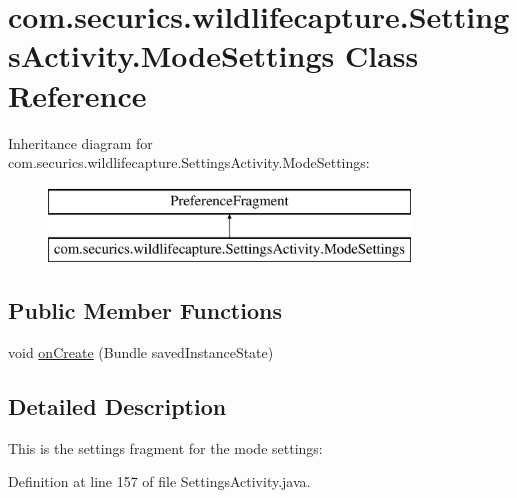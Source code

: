 \hypertarget{classcom_1_1securics_1_1wildlifecapture_1_1_settings_activity_1_1_mode_settings}{\section{com.\+securics.\+wildlifecapture.\+Settings\+Activity.\+Mode\+Settings Class Reference}
\label{classcom_1_1securics_1_1wildlifecapture_1_1_settings_activity_1_1_mode_settings}
}
Inheritance diagram for com.\+securics.\+wildlifecapture.\+Settings\+Activity.\+Mode\+Settings\+:\begin{figure}[H]
\begin{center}
\leavevmode
\includegraphics[height=2.000000cm]{classcom_1_1securics_1_1wildlifecapture_1_1_settings_activity_1_1_mode_settings}
\end{center}
\end{figure}
\subsection*{Public Member Functions}
\begin{DoxyCompactItemize}
\item 
void \hyperlink{classcom_1_1securics_1_1wildlifecapture_1_1_settings_activity_1_1_mode_settings_a24b6e1e1f928b8cab3db78781c296977}{on\+Create} (Bundle saved\+Instance\+State)
\end{DoxyCompactItemize}


\subsection{Detailed Description}
This is the settings fragment for the mode settings\+: 

Definition at line 157 of file Settings\+Activity.\+java.



